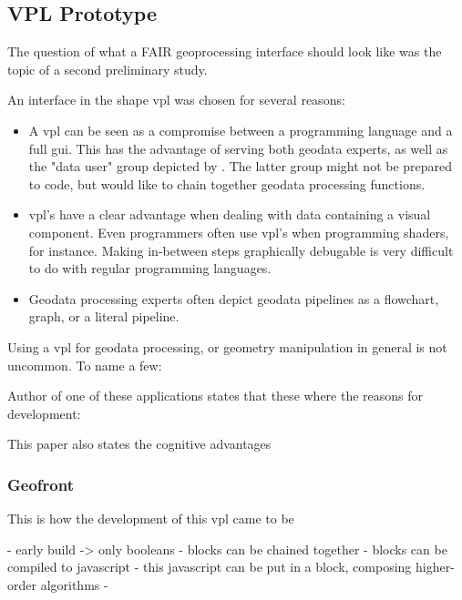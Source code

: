 \subsection{VPL Prototype}
\label{sec:preliminary-vpl}

The question of what a FAIR geoprocessing interface should look like was the topic of a second preliminary study. 


An interface in the shape \ac{vpl} was chosen for several reasons:

\begin{itemize}
  \item A \ac{vpl} can be seen as a compromise between a programming language and a full \ac{gui}. This has the advantage of serving both geodata experts, as well as the "data user" group depicted by \cite{brink_geospatial_2018}. The latter group might not be prepared to code, but would like to chain together geodata processing functions.
  \item \ac{vpl}'s have a clear advantage when dealing with data containing a visual component. Even programmers often use \ac{vpl}'s when programming shaders, for instance. Making in-between steps graphically debugable is very difficult to do with regular programming languages.  
  \item Geodata processing experts often depict geodata pipelines as a flowchart, graph, or a literal pipeline. 
\end{itemize}

Using a \ac{vpl} for geodata processing, or geometry manipulation in general is not uncommon. To name a few: 



Author of one of these applications states that these where the reasons for development: 

This paper also states the cognitive advantages 




\subsubsection*{Geofront}

This is how the development of this \ac{vpl} came to be

- early build -> only booleans
- blocks can be chained together
- blocks can be compiled to javascript
- this javascript can be put in a block, composing higher-order algorithms
- 